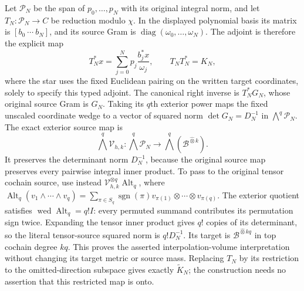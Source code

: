 Let $\mathcal P_N$ be the span of $p_0,\ldots,p_N$ with its original
integral norm, and let $T_N:\mathcal P_N\to C$ be reduction modulo
$\chi$. In the displayed polynomial basis its matrix is
$[b_0\ \cdots\ b_N]$, and its source Gram is
$\operatorname{diag}(\omega_0,\ldots,\omega_N)$.
The adjoint is therefore the explicit map
\[
 T_N^{*}x=\sum_{j=0}^Np_j\frac{b_j^*x}{\omega_j},\qquad
 T_NT_N^{*}=K_N,
 \tag{CV.6}
\]
where the star uses the fixed Euclidean pairing on the written target
coordinates, solely to specify this typed adjoint.
The canonical right inverse is $T_N^{*}G_N$, whose original source
Gram is $G_N$. Taking its $q$th exterior power maps the fixed
unscaled coordinate wedge to a vector of squared norm
$\det G_N=D_N^{-1}$ in $\bigwedge^q\mathcal P_N$.
The exact exterior source map is
\[
 \bigwedge^q\mathcal V_{h,k}:\bigwedge^q\mathcal P_N
 \longrightarrow\bigwedge^q(\mathscr B^{\widehat\otimes k}).
\]
It preserves the determinant norm $D_N^{-1}$, because the original
source map preserves every pairwise integral inner product.
To pass to the original tensor cochain source, use instead
$\mathcal V_{h,k}^{\otimes q}\operatorname{Alt}_q$, where
$\operatorname{Alt}_q(v_1\wedge\cdots\wedge v_q)
=\sum_{\pi\in S_q}\operatorname{sgn}(\pi)
v_{\pi(1)}\otimes\cdots\otimes v_{\pi(q)}$.
The exterior quotient satisfies
$\operatorname{wed}\operatorname{Alt}_q=q!I$: every permuted
summand contributes its permutation sign twice. Expanding the tensor
inner product gives $q!$ copies of its determinant, so the literal
tensor-source squared norm is $q!D_N^{-1}$. Its target is
$\mathscr B^{\widehat\otimes kq}$ in top cochain degree $kq$.
This proves the asserted interpolation-volume
interpretation without changing its target metric or source mass.
Replacing $T_N$ by its restriction to the omitted-direction subspace
gives exactly $\widetilde K_N$; the construction needs no assertion
that this restricted map is onto.

